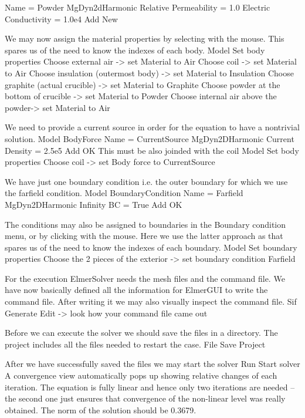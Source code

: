     Name = Powder
    MgDyn2dHarmonic
      Relative Permeability = 1.0
      Electric Conductivity = 1.0e4
    Add
    New
\ttend

We may now assign the material properties by selecting with the mouse.
This spares us of the 
need to know the indexes of each body.
\ttbegin
Model
  Set body properties
    Choose external air -> set Material to Air
    Choose coil -> set Material to Air
    Choose insulation (outermost body) -> set Material to Insulation
    Choose graphite (actual crucible) -> set Material to Graphite
    Choose powder at the bottom of crucible -> set Material to Powder
    Choose internal air above the powder-> set Material to Air
\ttend

We need to provide a current source in order for the equation to have a nontrivial solution.
\ttbegin
Model
  BodyForce
    Name = CurrentSource
    MgDyn2DHarmonic
      Current Density = 2.5e5
    Add
    OK
\ttend   
This must be also joinded with the coil
\ttbegin
Model
  Set body properties
    Choose coil -> set Body force to CurrentSource
\ttend


We have just one boundary condition i.e. the outer boundary for which we use the farfield condition.
\ttbegin
Model
  BoundaryCondition
    Name = Farfield
    MgDyn2DHarmonic
      Infinity BC = True
    Add
    OK
\ttend   

The conditions may also be assigned to boundaries in the Boundary condition menu, or 
by clicking with the mouse. Here we use the latter approach as that spares us of the 
need to know the indexes of each boundary.
\ttbegin
Model
  Set boundary properties
    Choose the 2 pieces of the exterior -> set boundary condition Farfield
\ttend

For the execution 
ElmerSolver needs the mesh files and the command file. We have now basically defined
all the information for ElmerGUI to write the command file. After writing it we may also visually 
inspect the command file.
\ttbegin
Sif 
  Generate
  Edit -> look how your command file came out  
\ttend

Before we can execute the solver we should save the files in a directory. The project includes
all the files needed to restart the case.
\ttbegin
File 
  Save Project
\ttend

After we have successfully saved the files we may start the solver
\ttbegin
Run
  Start solver
\ttend
A convergence view automatically pops up showing relative changes of each iteration.
The equation is fully linear and hence only two iterations are needed -- the second 
one just ensures that convergence of the non-linear level was really obtained. 
The norm of the solution should be 0.3679.



